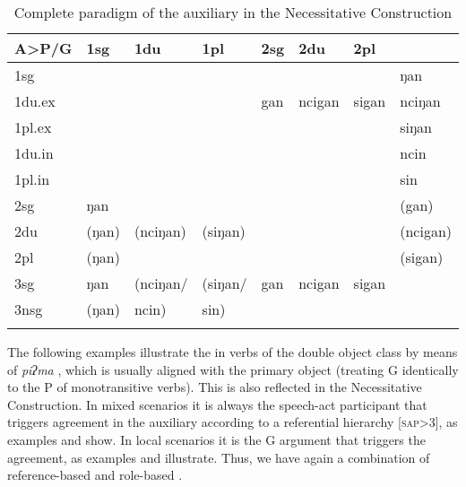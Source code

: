 \begin{table}[htp]
\begin{center}
\begin{tabular}{llllllll}
\lsptoprule
{\bf A>P/G} 	&	{\sc 1sg}&	{\sc 1du}& {\sc 1pl} &{\sc 2sg}&{\sc 2du}&{\sc 2pl}&{\sc 3 }\\
\midrule
{\sc 1sg}  		&\multicolumn{3}{c||}{\cellcolor[gray]{.8}}	& &&				& ŋan  \\
{\sc  1du.ex}   &\multicolumn{3}{c||}{\cellcolor[gray]{.8}}	&gan&ncigan&sigan	& nciŋan  \\
{\sc 1pl.ex}   	&\multicolumn{3}{c||}{\cellcolor[gray]{.8}}	& &&				& siŋan \\
\cline{5-7}
{\sc 1du.in}   	&\multicolumn{6}{c||}{\cellcolor[gray]{.8}}				& ncin  \\
{\sc 1pl.in}   	&\multicolumn{6}{c||}{\cellcolor[gray]{.8}}	 					& sin  \\
\midrule
{\sc 2sg}  		& ŋan	& & &\multicolumn{3}{c||}{\cellcolor[gray]{.8}}	& (gan) \\
\cline{2-2}
{\sc 2du}  	& (ŋan)& (nciŋan) &  (siŋan)	&\multicolumn{3}{c||}{\cellcolor[gray]{.8}}&  (ncigan) \\
{\sc 2pl}  	& (ŋan) &  &	&\multicolumn{3}{c||}{\cellcolor[gray]{.8}}			&  (sigan) \\
\midrule
{\sc 3sg}  	& ŋan	&  (nciŋan/&(siŋan/	 & gan&ncigan& sigan&\cellcolor[gray]{.8}\\
\cline{2-2}
{\sc 3nsg}  &  (ŋan)&ncin)  & 	sin)				&&&							&\cellcolor[gray]{.8} \\
\lspbottomrule
\end{tabular}
\caption{Complete paradigm of the auxiliary in the Necessitative Construction}\label{cop-agree}
\end{center}
\end{table}


The following examples illustrate the  in verbs of the double object class by means of  \emph{piʔma} , which is usually aligned with the primary object (treating G identically to the P of monotransitive verbs). This is also reflected in the Necessitative Construction. In mixed scenarios  it is always the speech-act participant that triggers agreement in the auxiliary according to a referential hierarchy [\textsc{sap}>3], as examples \Next[a] and \Next[b] show. In local scenarios it is the G argument that triggers the agreement, as examples \Next[c] and \Next[d] illustrate. Thus, we have again a combination of reference-based and role-based . 
 
